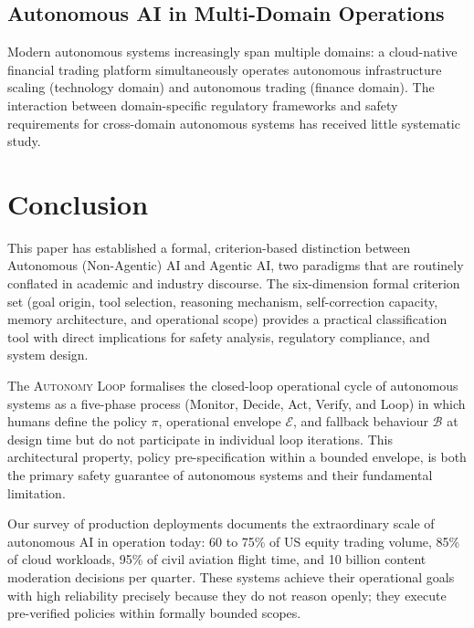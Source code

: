 \documentclass[12pt, a4paper]{article}
\begin{document}
\subsection{Autonomous AI in Multi-Domain Operations}
Modern autonomous systems increasingly span multiple domains: a cloud-native financial trading platform simultaneously operates autonomous infrastructure scaling (technology domain) and autonomous trading (finance domain). The interaction between domain-specific regulatory frameworks and safety requirements for cross-domain autonomous systems has received little systematic study.

\section{Conclusion}\label{sec:conclusion}

This paper has established a formal, criterion-based distinction between Autonomous (Non-Agentic) AI and Agentic AI, two paradigms that are routinely conflated in academic and industry discourse. The six-dimension formal criterion set (goal origin, tool selection, reasoning mechanism, self-correction capacity, memory architecture, and operational scope) provides a practical classification tool with direct implications for safety analysis, regulatory compliance, and system design.

The \textsc{Autonomy Loop} formalises the closed-loop operational cycle of autonomous systems as a five-phase process (Monitor, Decide, Act, Verify, and Loop) in which humans define the policy $\pi$, operational envelope $\mathcal{E}$, and fallback behaviour $\mathcal{B}$ at design time but do not participate in individual loop iterations. This architectural property, policy pre-specification within a bounded envelope, is both the primary safety guarantee of autonomous systems and their fundamental limitation.

Our survey of production deployments documents the extraordinary scale of autonomous AI in operation today: 60 to 75\% of US equity trading volume, 85\% of cloud workloads, 95\% of civil aviation flight time, and 10 billion content moderation decisions per quarter. These systems achieve their operational goals with high reliability precisely because they do not reason openly; they execute pre-verified policies within formally bounded scopes.
\end{document}
